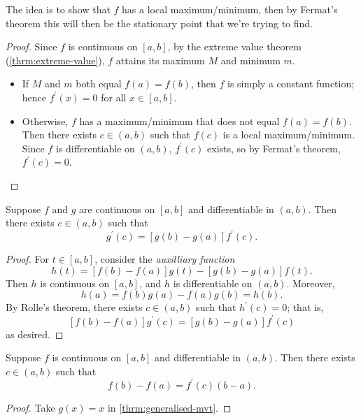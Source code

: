 The idea is to show that $f$ has a local maximum/minimum, then by Fermat's theorem this will then be the stationary point that we're trying to find.

\begin{proof}
Since $f$ is continuous on $[a,b]$, by the extreme value theorem (\ref{thrm:extreme-value}), $f$ attains its maximum $M$ and minimum $m$.
\begin{itemize}
\item If $M$ and $m$ both equal $f(a)=f(b)$, then $f$ is simply a constant function; hence $f^\prime(x)=0$ for all $x\in[a,b]$.

\item Otherwise, $f$ has a maximum/minimum that does not equal $f(a)=f(b)$. Then there exists $c\in(a,b)$ such that $f(c)$ is a local maximum/minimum. Since $f$ is differentiable on $(a,b)$, $f^\prime(c)$ exists, so by Fermat's theorem, $f^\prime(c)=0$.
\end{itemize}
\end{proof}

\begin{theorem}\label{thrm:generalised-mvt}
Suppose $f$ and $g$ are continuous on $[a,b]$ and differentiable in $(a,b)$. Then there exists $c\in(a,b)$ such that
\begin{equation}
[f(b)-f(a)]g^\prime(c)=[g(b)-g(a)]f^\prime(c).
\end{equation}
\end{theorem}

\begin{proof}
For $t\in[a,b]$, consider the \emph{auxilliary function}
\[h(t)=[f(b)-f(a)]g(t)-[g(b)-g(a)]f(t).\]
Then $h$ is continuous on $[a,b]$, and $h$ is differentiable on $(a,b)$. Moreover,
\[h(a)=f(b)g(a)-f(a)g(b)=h(b).\]
By Rolle's theorem, there exists $c\in(a,b)$ such that $h^\prime(c)=0$; that is,
\[[f(b)-f(a)]g^\prime(c)=[g(b)-g(a)]f^\prime(c)\]
as desired.
\end{proof}

\begin{theorem}\label{thrm:mvt}
Suppose $f$ is continuous on $[a,b]$ and differentiable in $(a,b)$. Then there exists $c\in(a,b)$ such that
\begin{equation}
f(b)-f(a)=f^\prime(c)(b-a).
\end{equation}
\end{theorem}

\begin{proof}
Take $g(x)=x$ in \ref{thrm:generalised-mvt}.
\end{proof}

